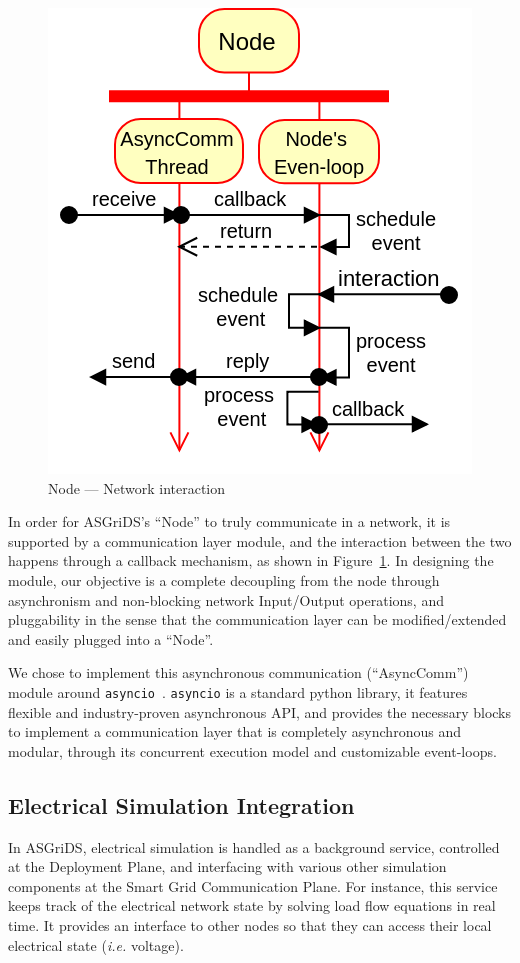 \documentclass[conference]{IEEEtran}
\begin{document}
\begin{figure}[htp]
	\centering
	\includegraphics[width=.7\linewidth]{async_comm.png}
	\caption{Node --- Network interaction}
	\label{async_comm}
\end{figure}

In order for ASGriDS's ``Node'' to truly communicate in a network, it is supported by a communication layer module, and the interaction between the two happens through a callback mechanism, as shown in Figure~\ref{async_comm}.
In designing the module, our objective is a complete decoupling from the node through asynchronism and non-blocking network Input/Output operations, and pluggability in the sense that the communication layer can be modified/extended and easily plugged into a ``Node''.

We chose to implement this asynchronous communication (``AsyncComm'') module around \texttt{asyncio}~\cite{AsyncioAsynchronousPython}.
\texttt{asyncio} is a standard python library, it features flexible and industry-proven asynchronous API, and provides the necessary blocks to implement a communication layer that is completely asynchronous and modular, through its concurrent execution model and customizable event-loops.

\subsection{Electrical Simulation Integration}

In ASGriDS, electrical simulation is handled as a background service, controlled at the Deployment Plane, and interfacing with various other simulation components at the Smart Grid Communication Plane. For instance, this service keeps track of the electrical network state by solving load flow equations in real time. It provides an interface to other nodes so that they can access their local electrical state (\emph{i.e.} voltage).
\end{document}
